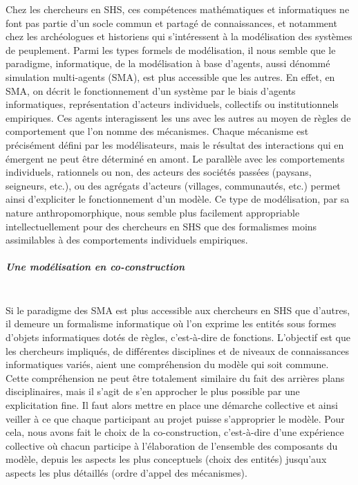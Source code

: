 Chez les chercheurs en SHS, ces compétences mathématiques et informatiques ne font pas partie d'un socle commun et partagé de connaissances, et notamment chez les archéologues et historiens qui s'intéressent à la modélisation des systèmes de peuplement.
Parmi les types formels de modélisation, il nous semble que le paradigme, informatique, de la modélisation à base d'agents, aussi dénommé \og simulation multi-agents\fg{} (SMA), est plus accessible que les autres.
En effet, en SMA, on décrit le fonctionnement d'un système par le biais d'agents informatiques, représentation d'acteurs individuels, collectifs ou institutionnels empiriques.
Ces agents interagissent les uns avec les autres au moyen de \og règles de comportement\fg{} que l'on nomme des mécanismes.
Chaque mécanisme est précisément défini par les modélisateurs, mais le résultat des interactions qui en émergent ne peut être déterminé en amont.
Le parallèle avec les comportements individuels, rationnels ou non, des acteurs des sociétés passées (paysans, seigneurs, etc.), ou des agrégats d'acteurs (villages, communautés, etc.) permet ainsi d'expliciter le fonctionnement d'un modèle.
Ce type de modélisation, par sa nature anthropomorphique, nous semble plus facilement appropriable intellectuellement pour des chercheurs en SHS que des formalismes moins assimilables à des comportements individuels empiriques.

\subparagraph{Une modélisation en co-construction}~\\

Si le paradigme des SMA est plus accessible aux chercheurs en SHS que d'autres, il demeure un formalisme informatique où l'on exprime les entités sous formes d'objets informatiques dotés de règles, c'est-à-dire de fonctions.
L'objectif est que les chercheurs impliqués, de différentes disciplines et de niveaux de connaissances informatiques variés, aient une compréhension du modèle qui soit commune.
Cette compréhension ne peut être totalement similaire du fait des arrières plans disciplinaires, mais il s'agit de s'en approcher le plus possible par une explicitation fine.
Il faut alors mettre en place une démarche collective et ainsi veiller à ce que chaque participant au projet puisse s'approprier le modèle.
Pour cela, nous avons fait le choix de la \og co-construction\fg{}, c'est-à-dire d'une expérience collective où chacun participe à l'élaboration de l'ensemble des composants du modèle, depuis les aspects les plus conceptuels (choix des entités) jusqu'aux aspects les plus détaillés (ordre d'appel des mécanismes).

